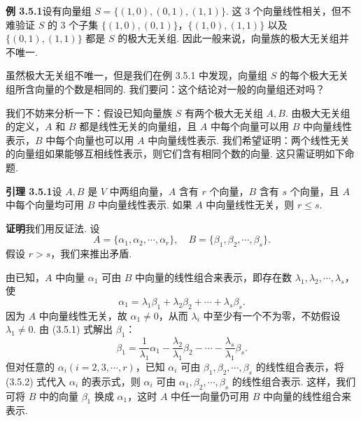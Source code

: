 \documentclass[UTF8, 12pt, fontset=fandol, oneside]{ctexart}
\begin{document}
\noindent\textbf{例 3.5.1}\quad 设有向量组 $S=\{(1,0),(0,1),(1,1)\}$. 这 3 个向量线性相关，但不难验证 $S$ 的 3 个子集 $\{(1,0),(0,1)\}$，$\{(1,0),(1,1)\}$ 以及 $\{(0,1),(1,1)\}$ 都是 $S$ 的极大无关组. 因此一般来说，向量族的极大无关组并不唯一.

虽然极大无关组不唯一，但是我们在例 3.5.1 中发现，向量组 $S$ 的每个极大无关组所含向量的个数是相同的. 我们要问：这个结论对一般的向量组还对吗？

我们不妨来分析一下：假设已知向量族 $S$ 有两个极大无关组 $A,B$. 由极大无关组的定义，$A$ 和 $B$ 都是线性无关的向量组，且 $A$ 中每个向量可以用 $B$ 中向量线性表示，$B$ 中每个向量也可以用 $A$ 中向量线性表示. 我们希望证明：两个线性无关的向量组如果能够互相线性表示，则它们含有相同个数的向量. 这只需证明如下命题.

\noindent\textbf{引理 3.5.1}\quad 设 $A,B$ 是 $V$ 中两组向量，$A$ 含有 $r$ 个向量，$B$ 含有 $s$ 个向量，且 $A$ 中每个向量均可用 $B$ 中向量线性表示. 如果 $A$ 中向量线性无关，则 $r\leq s$.

\noindent\textbf{证明}\quad 我们用反证法. 设
\[
A=\{\alpha_1,\alpha_2,\cdots,\alpha_r\},\quad
B=\{\beta_1,\beta_2,\cdots,\beta_s\}.
\]
假设 $r>s$，我们来推出矛盾.

由已知，$A$ 中向量 $\alpha_1$ 可由 $B$ 中向量的线性组合来表示，即存在数 $\lambda_1,\lambda_2,\cdots,\lambda_s$，使
\begin{equation}
\alpha_1=\lambda_1\beta_1+\lambda_2\beta_2+\cdots+\lambda_s\beta_s.
\tag{3.5.1}
\end{equation}
因为 $A$ 中向量线性无关，故 $\alpha_1\neq 0$，从而 $\lambda_i$ 中至少有一个不为零，不妨假设 $\lambda_1\neq 0$. 由 (3.5.1) 式解出 $\beta_1$：
\begin{equation}
\beta_1=\frac{1}{\lambda_1}\alpha_1-\frac{\lambda_2}{\lambda_1}\beta_2-\cdots-\frac{\lambda_s}{\lambda_1}\beta_s.
\tag{3.5.2}
\end{equation}
但对任意的 $\alpha_i(i=2,3,\cdots,r)$，已知 $\alpha_i$ 可由 $\beta_1,\beta_2,\cdots,\beta_s$ 的线性组合表示，将 (3.5.2) 式代入 $\alpha_i$ 的表示式，则 $\alpha_i$ 可由 $\alpha_1,\beta_2,\cdots,\beta_s$ 的线性组合表示. 这样，我们可将 $B$ 中的向量 $\beta_1$ 换成 $\alpha_1$，这时 $A$ 中任一向量仍可用 $B$ 中向量的线性组合来表示.
\end{document}
